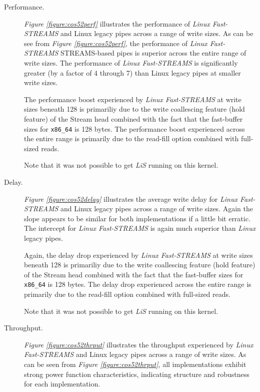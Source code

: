 \documentclass[letterpaper,final,notitlepage,twocolumn,10pt,twoside]{article}
\begin{document}
\begin{description}

\item[Performance.]

\textit{Figure \ref{figure:cos52perf}}
illustrates the performance of \textsl{Linux Fast-STREAMS} and Linux legacy pipes across a range of
write sizes.  As can be see from \textit{Figure \ref{figure:cos52perf}}, the performance of
\textsl{Linux Fast-STREAMS} STREAMS-based pipes is superior across the entire
range of write sizes.  The performance of \textsl{Linux Fast-STREAMS} is significantly greater (by a
factor of 4 through 7) than Linux legacy pipes at smaller write sizes.

The performance boost experienced by \textsl{Linux Fast-STREAMS} at write sizes beneath 128 is
primariliy due to the write coallescing feature (hold feature) of the Stream head combined with the
fact that the fast-buffer sizes for \texttt{x86\_64} is 128 bytes.
The performance boost experienced across the entire range is primarily due to the read-fill option
combined with full-sized reads.

Note that it was not possible to get \textsl{LiS} running on this kernel.

\item[Delay.]

\textit{Figure \ref{figure:cos52delay}}
illustrates the average write delay for \textsl{Linux Fast-STREAMS} and Linux legacy pipes across a
range of write sizes.  Again the slope appears to be similar for both
implementations if a little bit erratic.
The intercept for \textsl{Linux Fast-STREAMS} is again much superior than \textsl{Linux} legacy
pipes.

Again, the delay drop experienced by \textsl{Linux Fast-STREAMS} at write sizes beneath 128 is
primariliy due to the write coallescing feature (hold feature) of the Stream head combined with the
fact that the fast-buffer sizes for \texttt{x86\_64} is 128 bytes.
The delay drop experienced across the entire range is primarily due to the read-fill option
combined with full-sized reads.

Note that it was not possible to get \textsl{LiS} running on this kernel.

\item[Throughput.]

\textit{Figure \ref{figure:cos52thrput}}
illustrates the throughput experienced by \textsl{Linux Fast-STREAMS} and Linux legacy
pipes across a range of write sizes.
As can be seen from \textit{Figure \ref{figure:cos52thrput}},
all implementations exhibit strong power function characteristics, indicating structure and
robustness for each implementation.


\end{description}
\end{document}
